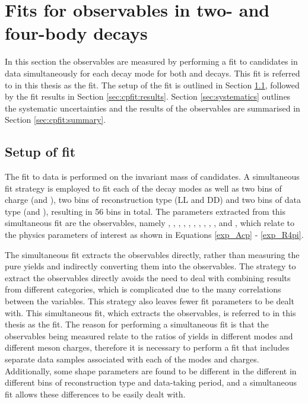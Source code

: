 \clearpage
%

\chapter{\label{ch:5-cpfit}Fits for \CP observables in two- and four-body decays} 

\minitoc

In this section the \CP observables are measured by performing a fit to \btodkst candidates in data simultaneously for each \Dz decay mode for both \Bp and \Bm decays. This fit is referred to in this thesis as the \CP fit. The setup of the \CP fit is outlined in Section \ref{sec:cpfit:setup}, followed by the fit results in Section \ref{sec:cpfit:results}. Section \ref{sec:systematics} outlines the systematic uncertainties and the results of the \CP observables are summarised in Section \ref{sec:cpfit:summary}.

\section{Setup of \CP fit}
\label{sec:cpfit:setup}

The fit to data is performed on the invariant mass of \btodkst candidates. A simultaneous fit strategy is employed to fit each of the \Dz decay modes as well as two bins of \B charge (\Bp and \Bm), two bins of \KS reconstruction type (LL and DD) and two bins of data type (\runone and \runtwo), resulting in 56 bins in total. The parameters extracted from this simultaneous fit are the \CP observables, namely \Akpi, \Akk, \Apipi, \Rkk, \Rpipi, \Rptwo, \Rmtwo, \Akpipipi, \Apipipipi, \Rpipipipi, \Rpfour and \Rmfour, which relate to the physics parameters of interest as shown in Equations \ref{exp_Acp} - \ref{exp_R4pi}.

The simultaneous fit extracts the \CP observables directly, rather than measuring the pure yields and indirectly converting them into the \CP observables. The strategy to extract the \CP observables directly avoids the need to deal with combining results from different categories, which is complicated due to the many correlations between the variables. This strategy also leaves fewer fit parameters to be dealt with. This simultaneous fit, which extracts the \CP observables, is referred to in this thesis as the \CP fit. The reason for performing a simultaneous fit is that the \CP observables being measured relate to the ratios of yields in different \Dz modes and different \B meson charges, therefore it is necessary to perform a fit that includes separate data samples associated with each of the modes and charges. Additionally, some shape parameters are found to be different in the different in different bins of \KS reconstruction type and data-taking period, and a simultaneous fit allows these differences to be easily dealt with. 

